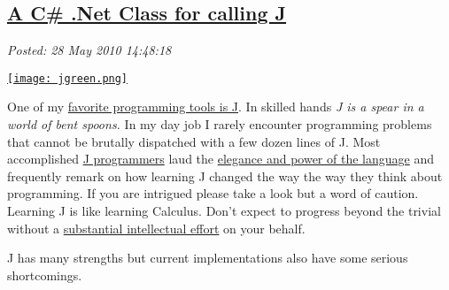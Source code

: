 %

\subsection*{\href{https://bakerjd99.wordpress.com/2010/05/28/a-c-net-class-for-calling-j/}{A C\# .Net Class for calling J}}


\noindent\emph{Posted: 28 May 2010 14:48:18}
\vspace{6pt}

\captionsetup[floatingfigure]{labelformat=empty}
\begin{floatingfigure}[l]{0.12\textwidth}
\centering
\href{http://www.jsoftware.com/}{\texttt{[image: jgreen.png]}}
\label{fig:537X0}
\end{floatingfigure}One of my \href{http://www.jsoftware.com/}{favorite programming tools is
J}. In skilled hands \emph{J is a spear in a world of bent spoons.} In my
day job I rarely encounter programming problems that cannot be brutally
dispatched with a few dozen lines of J. Most accomplished
\href{http://www.lulu.com/product/paperback/j-for-c-programmers/4669553}{J
programmers} laud the
\href{http://portal.acm.org/citation.cfm?id=508562}{elegance and power
of the language} and frequently remark on how learning J changed the way
the way they think about programming. If you are intrigued please take a
look but a word of caution. Learning J is like learning Calculus. Don't
expect to progress beyond the trivial without a
\href{http://norvig.com/21-days.html}{substantial intellectual effort}
on your behalf.

J has many strengths but current implementations also have some serious
shortcomings.

